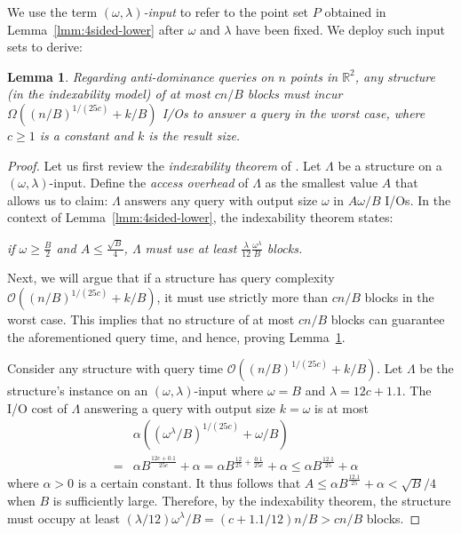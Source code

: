 \documentclass{sig-alternate}
\newtheorem{lemma}{Lemma}
\def\fr{\frac}
\def\real{\mathbb{R}}
\def\nn{\nonumber}
\def\fr{\frac}
\newcommand{\bigO}{\mathcal{O}}
\renewcommand{\(}{\left(}
\renewcommand{\)}{\right)}
\begin{document}
We use the term {\em $(\omega, \lambda)$-input} to refer to the point set $P$
obtained in Lemma~\ref{lmm:4sided-lower} after $\omega$ and $\lambda$ have been
fixed. We deploy such input sets to derive:

\begin{lemma} \label{lmm:4sided-lower-detailed}
  Regarding anti-dominance queries on $n$ points in $\real^2$, any structure
  (in the indexability model) of at most $cn/B$ blocks must incur
  $\Omega((n/B)^{1/(25c)} + k/B)$ I/Os to answer a query in the worst case,
  where $c \ge 1$ is a constant and $k$ is the result size.
\end{lemma}

\begin{fullenv}
\begin{proof}
  Let us first review the {\em indexability theorem} of \cite[Theorem
  5.5]{HKMPS02}. Let $\Lambda$ be a structure on a $(\omega, \lambda)$-input.
  Define the {\em access overhead} of $\Lambda$ as the smallest value $A$ that
  allows us to claim: $\Lambda$ answers any query with output size $\omega$ in
  $A\omega/B$ I/Os. In the context of Lemma~\ref{lmm:4sided-lower}, the
  indexability theorem states:
	\begin{center}
    {\em if $\omega \ge \fr{B}{2}$ and $A \le \fr{\sqrt{B}}{4}$, $\Lambda$ must
    use at least $\fr{\lambda}{12} \fr{\omega^\lambda}{B}$ blocks.}
	\end{center}

  Next, we will argue that if a structure has query complexity
  $\bigO((n/B)^{1/(25c)} + k/B)$, it must use strictly more than $cn/B$ blocks
  in the worst case. This implies that no structure of at most $cn/B$ blocks
  can guarantee the aforementioned query time, and hence, proving
  Lemma~\ref{lmm:4sided-lower-detailed}.

  Consider any structure with query time $\bigO((n/B)^{1/(25c)} + k/B)$. Let
  $\Lambda$ be the structure's instance on an $(\omega, \lambda)$-input where
  $\omega = B$ and $\lambda = 12c+1.1$. The I/O cost of $\Lambda$ answering a
  query with output size $k = \omega$ is at most
	\begin{eqnarray}
		&& \alpha((\omega^\lambda/B)^{1/(25c)} + \omega/B) \nn \\
		&=&
		\alpha B^{\fr{12c + 0.1}{25c}} + \alpha
		=
		\alpha B^{\fr{12}{25} + \fr{0.1}{25c}} + \alpha
		\le
		\alpha B^{\fr{12.1}{25}} + \alpha \nn
	\end{eqnarray}
  where $\alpha > 0$ is a certain constant. It thus follows that $A \le \alpha
  B^{\fr{12.1}{25}} + \alpha < \sqrt{B}/4$ when $B$ is sufficiently large.
  Therefore, by the indexability theorem, the structure must occupy at least
  $(\lambda/12) \omega^\lambda/B = (c + 1.1/12)n/B > cn/B$ blocks.
\end{proof}
\end{fullenv}
\end{document}
